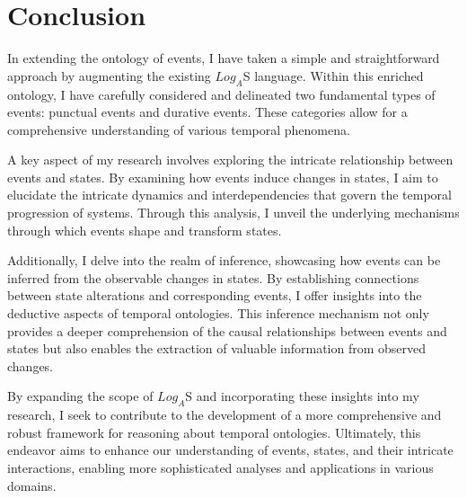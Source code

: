 \chapter*{Conclusion}


In extending the ontology of events, I have taken a simple and straightforward approach by augmenting the existing $Log_A$S language.
Within this enriched ontology, I have carefully considered and delineated two fundamental types of events: punctual events and durative events. These categories allow for a comprehensive understanding of various temporal phenomena.

A key aspect of my research involves exploring the intricate relationship between events and states.
By examining how events induce changes in states, I aim to elucidate the intricate dynamics and interdependencies that govern the temporal progression of systems. Through this analysis, I unveil the underlying mechanisms through which events shape and transform states.

Additionally, I delve into the realm of inference, showcasing how events can be inferred from the observable changes in states.
By establishing connections between state alterations and corresponding events, I offer insights into the deductive aspects of temporal ontologies.
This inference mechanism not only provides a deeper comprehension of the causal relationships between events and states but also enables the extraction of valuable information from observed changes.

By expanding the scope of $Log_A$S and incorporating these insights into my research, I seek to contribute to the development of a more comprehensive and robust framework for reasoning about temporal ontologies. Ultimately, this endeavor aims to enhance our understanding of events, states, and their intricate interactions, enabling more sophisticated analyses and applications in various domains.